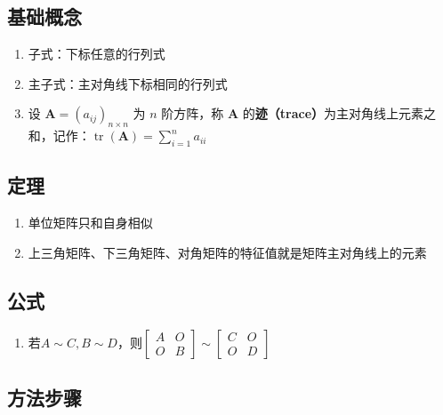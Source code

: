 \documentclass[./linear_algebra.tex]{subfiles}
\begin{document}
    \subsection{基础概念}

    \begin{enumerate}
        \item 子式：下标任意的行列式
        \item 主子式：主对角线下标相同的行列式
        \item 设 $\mathbf{A} = (a_{ij})_{n \times n}$ 为 $n$ 阶方阵，称 $\mathbf{A}$ 的\textbf{迹（trace）}为主对角线上元素之和，记作：$\operatorname{tr}(\mathbf{A}) = \sum\limits_{i=1}^{n} a_{ii}$
    \end{enumerate}

    \subsection{定理}

    \begin{enumerate}
        \item 单位矩阵只和自身相似
        \item 上三角矩阵、下三角矩阵、对角矩阵的特征值就是矩阵主对角线上的元素
    \end{enumerate}

    \subsection{公式}

    \begin{enumerate}
        \item 若$A\sim C, B\sim D$，则$\begin{bmatrix}
                                          A & O \\
                                          O & B
        \end{bmatrix}\sim \begin{bmatrix}
                              C & O \\
                              O & D
        \end{bmatrix}$
    \end{enumerate}

    \subsection{方法步骤}
\end{document}
